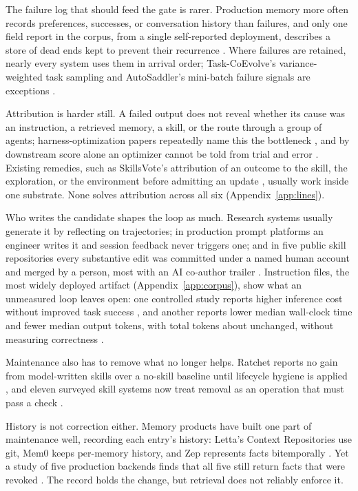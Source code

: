 The failure log that should feed the gate is rarer. Production memory more often records preferences, successes, or conversation history than failures, and only one field report in the corpus, from a single self-reported deployment, describes a store of dead ends kept to prevent their recurrence \citep{helwig2026memory}. Where failures are retained, nearly every system uses them in arrival order; Task-CoEvolve's variance-weighted task sampling and AutoSaddler's mini-batch failure signals are exceptions \citep{miyai2026taskcoevolve, park2026autosaddler}.

Attribution is harder still. A failed output does not reveal whether its cause was an instruction, a retrieved memory, a skill, or the route through a group of agents; harness-optimization papers repeatedly name this the bottleneck \citep{lin2026ahe, lee2026metaharness}, and by downstream score alone an optimizer cannot be told from trial and error \citep{ong2026harnesseval}. Existing remedies, such as SkillsVote's attribution of an outcome to the skill, the exploration, or the environment before admitting an update \citep{liu2026skillsvote}, usually work inside one substrate. None solves attribution across all six (Appendix~\ref{app:lines}).

Who writes the candidate shapes the loop as much. Research systems usually generate it by reflecting on trajectories; in production prompt platforms an engineer writes it and session feedback never triggers one; and in five public skill repositories every substantive edit was committed under a named human account and merged by a person, most with an AI co-author trailer \citep{shen2026whomaintains}. Instruction files, the most widely deployed artifact (Appendix~\ref{app:corpus}), show what an unmeasured loop leaves open: one controlled study reports higher inference cost without improved task success \citep{gloaguen2026agentsmd}, and another reports lower median wall-clock time and fewer median output tokens, with total tokens about unchanged, without measuring correctness \citep{lulla2026empirical}.

Maintenance also has to remove what no longer helps. Ratchet reports no gain from model-written skills over a no-skill baseline until lifecycle hygiene is applied \citep{zhang2026ratchet}, and eleven surveyed skill systems now treat removal as an operation that must pass a check \citep{zhang2026librarydrift, wei2026skillsmith, pu2026skillops, wang2026assay}.

History is not correction either. Memory products have built one part of maintenance well, recording each entry's history: Letta's Context Repositories use git, Mem0 keeps per-memory history, and Zep represents facts bitemporally \citep{letta2026memfs, mem02026history, zep2026facts}. Yet a study of five production backends finds that all five still return facts that were revoked \citep{shen2026revoked}. The record holds the change, but retrieval does not reliably enforce it.

